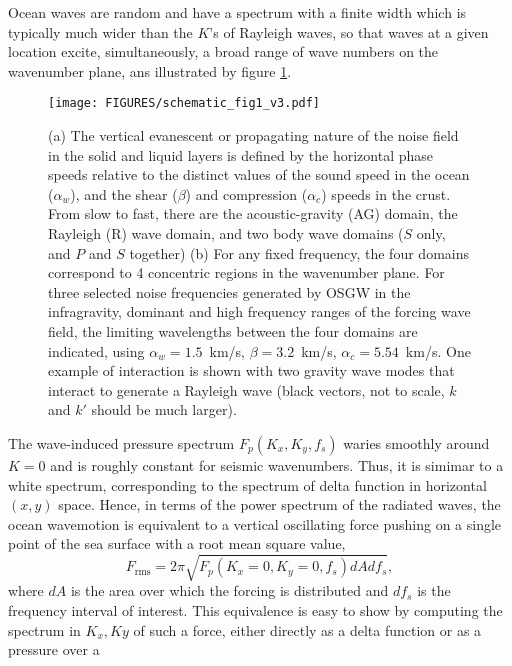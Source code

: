 Ocean waves are random and have a spectrum with a finite width which is typically much wider than the $K$'s of Rayleigh waves, so that waves at a given location excite, simultaneously, a broad range of wave numbers 
on the wavenumber plane, ans illustrated by figure \ref{fig:4domains}.
\begin{figure}[htb]
\centerline{\texttt{[image: FIGURES/schematic\_fig1\_v3.pdf]}}
  \caption{(a) 
The vertical evanescent or propagating nature of the noise field in the solid and liquid layers is 
defined  by the horizontal phase speeds relative to the distinct values of the sound speed 
in the ocean ($\alpha_w$), and the shear ($\beta$) and compression ($\alpha_c$) speeds in the crust.
 From slow to fast, there are the acoustic-gravity (AG) domain, the Rayleigh (R) wave 
domain, and two body wave domains ($S$ only, and $P$ and $S$ together) 
(b)  For any fixed frequency, the four domains correspond to 4 concentric regions 
in the wavenumber plane. For three selected noise frequencies generated by  OSGW in the  infragravity, dominant and high frequency ranges of the forcing 
wave field, the limiting wavelengths between the four domains are indicated, using $\alpha_w=1.5$~km/s, $\beta=3.2$~km/s, 
$\alpha_c=5.54$~km/s. One example of interaction is shown with 
two gravity wave modes that interact to generate a Rayleigh wave  (black vectors, not to scale, $k$ and $k'$ should be much larger).}
\label{fig:4domains}
\end{figure}
The wave-induced pressure spectrum $F_p(K_x,K_y,f_s)$ waries smoothly around $K=0$ and is roughly constant for seismic wavenumbers. Thus, it is simimar to a white spectrum, corresponding 
to the spectrum of delta function in horizontal $(x,y)$ space. Hence, in terms of the power spectrum of the radiated waves, the ocean wavemotion is equivalent to a vertical oscillating force pushing on a single point of the sea surface with a root mean square value, 
\begin{equation}
F_{\mathrm{rms}} = 2 \pi \sqrt{F_{p}(K_x=0,K_y=0,f_s) dA d f_s},
\end{equation}
where $dA$ is the area over which the forcing is distributed and $d f_s$ is the frequency interval of interest. This 
equivalence is easy to show by computing the spectrum in $K_x,Ky$ of such a force, either directly as a delta function or as a pressure over a 
